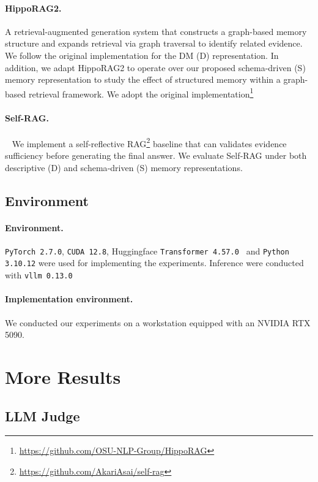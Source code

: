 \documentclass{article}
\theoremstyle{plain}
\theoremstyle{definition}
\theoremstyle{remark}
\begin{document}
\paragraph{HippoRAG2.}
A retrieval-augmented generation system that constructs a graph-based memory structure and expands retrieval via graph traversal to identify related evidence.
We follow the original implementation for the DM (D) representation.
In addition, we adapt HippoRAG2 to operate over our proposed schema-driven (S) memory representation to study the effect of structured memory within a graph-based retrieval framework. We adopt the original implementation\footnote{\href{https://github.com/OSU-NLP-Group/HippoRAG}{https://github.com/OSU-NLP-Group/HippoRAG}}

\paragraph{Self-RAG.}~\citep{asai2024selfrag}
We implement a self-reflective RAG\footnote{\href{https://github.com/AkariAsai/self-rag}{https://github.com/AkariAsai/self-rag}} baseline that can validates evidence sufficiency before generating the final answer.
We evaluate Self‑RAG under both descriptive (D) and schema‑driven (S) memory representations.

\subsection{Environment}
\label{appendix:exp_setup}
\paragraph{Environment.} 
\texttt{PyTorch 2.7.0}, \texttt{CUDA 12.8}, Huggingface \texttt{Transformer 4.57.0 } and \texttt{Python 3.10.12} were used for implementing the experiments. Inference were conducted with \texttt{vllm 0.13.0}
\paragraph{Implementation environment.}
We conducted our experiments on a workstation equipped with an NVIDIA RTX 5090.




\section{More Results}
\label{app:evaluation}

\subsection{LLM Judge}
\label{app:llmjudge}
\end{document}
